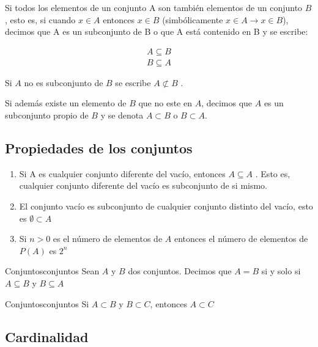 Si todos los elementos de un conjunto A son también elementos de un conjunto
$B$, esto es, si cuando $x \in A$ entonces $x \in B$ (simbólicamente $x \in A
\rightarrow x \in B$), decimos que A es un subconjunto de B o que A está
contenido en B y se escribe:

\begin{equation}
    \begin{array}{l}
        A \subseteq B \\
        B \subseteq A
    \end{array}
\end{equation}

Si $A$ no es subconjunto de $B$ se escribe $A \not \subset B$ .

Si además existe un elemento de $B$ que no este en $A$, decimos que $A$ es un
subconjunto propio de $B$ y se denota $A \subset B$ o $B \subset A$.

\subsection{Propiedades de los conjuntos}

\begin{enumerate}
    \item Si A es cualquier conjunto diferente del vacío, entonces $A \subseteq A$ . Esto es, cualquier conjunto
    diferente del vacío es subconjunto de si mismo.
    
\item El conjunto vacío es subconjunto de cualquier conjunto distinto del vacío,
esto es $\emptyset \subset A$

\item Si $n>0$ es el número de elementos de $A$ entonces el número de elementos de $P(A)$ es $2^n$
\end{enumerate}

\begin{theorem}{Conjuntos}{conjuntos}
Sean $A$ y $B$ dos conjuntos. Decimos que $A=B$ si y solo si $A \subseteq B$ y
$B \subseteq A$
\end{theorem}

\begin{theorem}{Conjuntos}{conjuntos}
    Si $ A \subset B $ y $ B \subset C $, entonces $ A \subset C $
\end{theorem}

\subsection{Cardinalidad}

